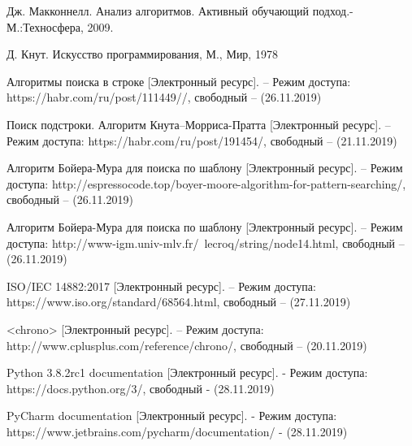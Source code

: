 \documentclass[a4paper,12pt]{article}
\begin{document}
\begin{thebibliography}{8}
	
	Дж. Макконнелл. Анализ алгоритмов. Активный 
	обучающий 
	подход.-М.:Техносфера, 2009.
	
	Д. Кнут. Искусство программирования, М., Мир, 1978
	
	Алгоритмы поиска в строке [Электронный ресурс]. – Режим доступа: https://habr.com/ru/post/111449//, свободный – (26.11.2019)
	
	Поиск подстроки. Алгоритм Кнута–Морриса-Пратта [Электронный ресурс]. – Режим доступа: https://habr.com/ru/post/191454/, свободный – (21.11.2019)
	
	Алгоритм Бойера-Мура для поиска по шаблону [Электронный ресурс]. – Режим доступа: http://espressocode.top/boyer-moore-algorithm-for-pattern-searching/, свободный – (26.11.2019)
	
	Алгоритм Бойера-Мура для поиска по шаблону [Электронный ресурс]. – Режим доступа: http://www-igm.univ-mlv.fr/~lecroq/string/node14.html, свободный – (26.11.2019)
	
	ISO/IEC 14882:2017 [Электронный ресурс]. – Режим доступа: https://www.iso.org/standard/68564.html, свободный – (27.11.2019)
	
	<chrono> [Электронный ресурс]. – Режим доступа: http://www.cplusplus.com/reference/chrono/, свободный – (20.11.2019)
	
	Python 3.8.2rc1 documentation [Электронный ресурс]. - Режим доступа: https://docs.python.org/3/, свободный - (28.11.2019)
	
	PyCharm documentation [Электронный ресурс]. - Режим доступа: https://www.jetbrains.com/pycharm/documentation/ - (28.11.2019)
	
\end{thebibliography}
\end{document}
